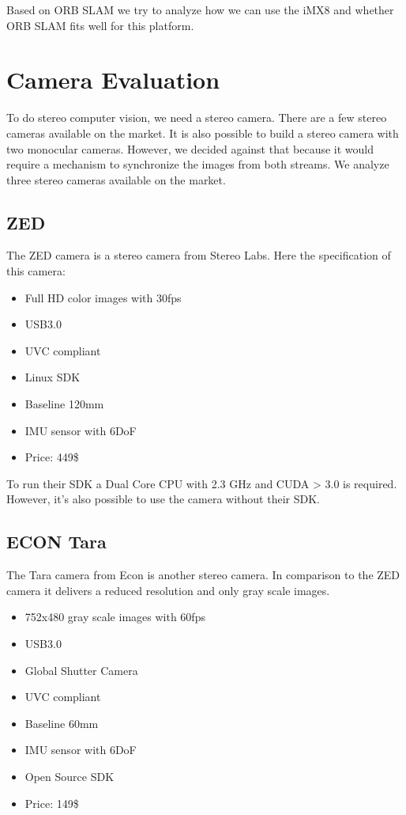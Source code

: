 \documentclass[11pt,a4paper,titlepage,oneside]{report}
\begin{document}
Based on ORB SLAM we try to analyze how we can use the iMX8 and whether ORB SLAM fits well for this platform.

\chapter{Camera Evaluation}

To do stereo computer vision, we need a stereo camera. There are a few stereo cameras available on the market. It is also possible to build a stereo camera with two monocular cameras. However, we decided against that because it would require a mechanism to synchronize the images from both streams. We analyze three stereo cameras available on the market.

\section{ZED}
The ZED camera \cite{zed} is a stereo camera from Stereo Labs. Here the specification of this camera:
\begin{itemize}
	\item Full HD color images with 30fps
	\item USB3.0
	\item UVC compliant
	\item Linux SDK
	\item Baseline 120mm
	\item IMU sensor with 6DoF
	\item Price: 449\$
\end{itemize}

To run their SDK a Dual Core CPU with 2.3 GHz and CUDA > 3.0 is required. However, it's also possible to use the camera without their SDK.

\section{ECON Tara}
The Tara camera \cite{tara} from Econ is another stereo camera. In comparison to the ZED camera it delivers a reduced resolution and only gray scale images.
\begin{itemize}
	\item 752x480 gray scale images with 60fps
	\item USB3.0
	\item Global Shutter Camera
	\item UVC compliant
	\item Baseline 60mm
	\item IMU sensor with 6DoF
	\item Open Source SDK
	\item Price: 149\$
\end{itemize}
\end{document}
